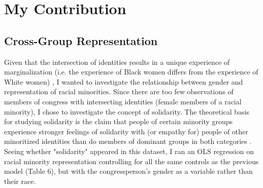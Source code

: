 \documentclass[12pt,letterpaper]{article}
\begin{document}
	\section{My Contribution}
	\subsection{Cross-Group Representation}
	Given that the intersection of identities results in a unique experience of marginalization (i.e. the experience of Black women differs from the experience of White women) \parencite{crenshaw_intersectionality}, I wanted to investigate the relationship between gender and representation of racial minorities. Since there are too few observations of members of congress with intersecting identities (female members of a racial minority), I chose to investigate the concept of solidarity. The theoretical basis for studying solidarity is the claim that people of certain minority groups experience stronger feelings of solidarity with (or empathy for) people of other minoritized identities than do members of dominant groups in both categories \parencite{hughes_tuch_gender_racial_attitudes, Dehingia2023}. Seeing whether "solidarity" appeared in this dataset, I ran an OLS regression on racial minority representation controlling for all the same controls as the previous model (Table 6), but with the congressperson's gender as a variable rather than their race.\\
	
	
	
\end{document}
